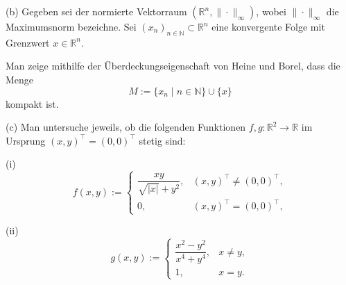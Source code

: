 \bigskip

(b) Gegeben sei der normierte Vektorraum $(\mathbb{R}^n,\|\cdot\|_\infty)$, wobei $\|\cdot\|_\infty$ die Maximumsnorm bezeichne. Sei $(x_n)_{n\in\mathbb{N}}\subset\mathbb{R}^n$ eine konvergente Folge mit Grenzwert $x\in\mathbb{R}^n$.

Man zeige mithilfe der Überdeckungseigenschaft von Heine und Borel, dass die Menge
\[
M := \{x_n \mid n\in\mathbb{N}\}\cup\{x\}
\]
kompakt ist. \hfill {}

\bigskip

(c) Man untersuche jeweils, ob die folgenden Funktionen $f,g:\mathbb{R}^2\to\mathbb{R}$ im Ursprung $(x,y)^\top=(0,0)^\top$ stetig sind:

(i)
\[
f(x,y):=\begin{cases}
\dfrac{x y}{\sqrt{|x|} + y^2}, & (x,y)^\top\neq(0,0)^\top,\\[6pt]
0, & (x,y)^\top=(0,0)^\top,
\end{cases}
\]

(ii)
\[
g(x,y):=\begin{cases}
\dfrac{x^2-y^2}{x^4+y^4}, & x\neq y,\\[6pt]
1, & x=y.
\end{cases}
\]
\hfill {}

\newpage
